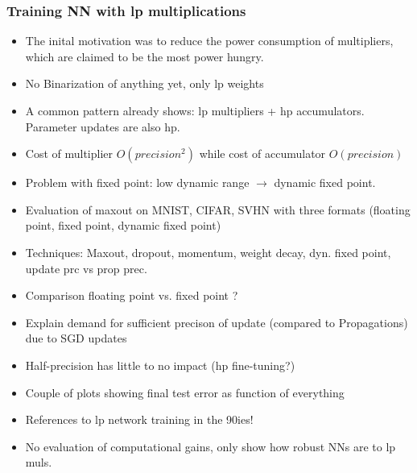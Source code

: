 \documentclass{article}
\begin{document}
\subsubsection*{Training NN with lp multiplications}
    \begin{itemize}
    \item The inital motivation was to reduce the power consumption of multipliers, which are claimed to be the most power hungry.
    \item No Binarization of anything yet, only lp weights
    \item A common pattern already shows: lp multipliers + hp accumulators. Parameter updates are also hp.
    \item Cost of multiplier $O(precision^2)$ while cost of accumulator $O(precision)$
    \item Problem with fixed point: low dynamic range $\rightarrow$ dynamic fixed point.
    \item Evaluation of maxout on MNIST, CIFAR, SVHN with three formats (floating
    point, fixed point, dynamic fixed point)
    \item Techniques: Maxout, dropout, momentum, weight decay, dyn. fixed point, update prc vs prop prec.
    \item Comparison floating point vs. fixed point ?
    \item Explain demand for sufficient precison of update (compared to Propagations) due to SGD updates
    \item Half-precision has little to no impact (hp fine-tuning?)
    \item Couple of plots showing final test error as function of everything
    \item References to lp network training in the 90ies!
    \item No evaluation of computational gains, only show how robust NNs are to lp muls.
    \end{itemize}
\end{document}
